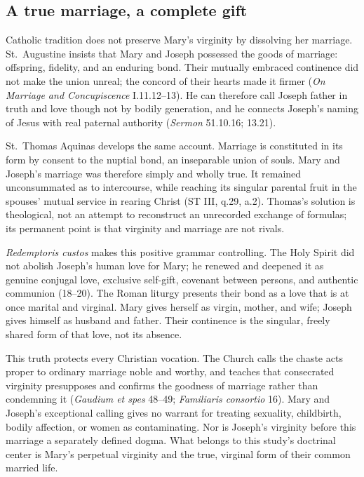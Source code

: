 \subsection{A true marriage, a complete gift}

Catholic tradition does not preserve Mary's virginity by dissolving her
marriage.  St.~Augustine insists that Mary and Joseph possessed the goods of
marriage: offspring, fidelity, and an enduring bond.  Their mutually embraced
continence did not make the union unreal; the concord of their hearts made it
firmer (\emph{On Marriage and Concupiscence} I.11.12--13).  He can therefore
call Joseph father in truth and love though not by bodily generation, and he
connects Joseph's naming of Jesus with real paternal authority
(\emph{Sermon} 51.10.16; 13.21).

St.~Thomas Aquinas develops the same account.  Marriage is constituted in its
form by consent to the nuptial bond, an inseparable union of souls.  Mary and
Joseph's marriage was therefore simply and wholly true.  It remained
unconsummated as to intercourse, while reaching its singular parental fruit in
the spouses' mutual service in rearing Christ (ST III, q.29, a.2).  Thomas's
solution is theological, not an attempt to reconstruct an unrecorded exchange
of formulas; its permanent point is that virginity and marriage are not
rivals.

\emph{Redemptoris custos} makes this positive grammar controlling.  The Holy
Spirit did not abolish Joseph's human love for Mary; he renewed and deepened it
as genuine conjugal love, exclusive self-gift, covenant between persons, and
authentic communion (18--20).  The Roman liturgy presents their bond as a love
that is at once marital and virginal.  Mary gives herself as virgin, mother, and wife;
Joseph gives himself as husband and father.  Their continence is the singular,
freely shared form of that love, not its absence.

This truth protects every Christian vocation.  The Church calls the chaste
acts proper to ordinary marriage noble and worthy, and teaches that consecrated
virginity presupposes and confirms the goodness of marriage rather than
condemning it (\emph{Gaudium et spes} 48--49; \emph{Familiaris consortio} 16).
Mary and Joseph's exceptional calling gives no warrant for treating sexuality,
childbirth, bodily affection, or women as contaminating.  Nor is Joseph's
virginity before this marriage a separately defined dogma.  What belongs to
this study's doctrinal center is Mary's perpetual virginity and the true,
virginal form of their common married life.

